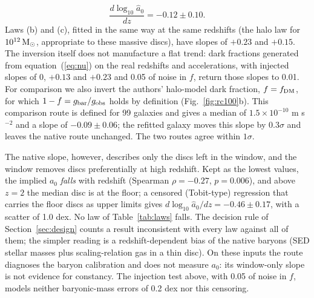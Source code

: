 \documentclass[fleqn,usenatbib]{mnras}
\begin{document}
\begin{equation}
\frac{d\log_{10}\hat a_0}{dz}=-0.12\pm0.10 .
\end{equation}
Laws (b) and (c), fitted in the same way at the same redshifts (the halo law for $10^{12}\,{\rm M_\odot}$, appropriate to these massive discs), have slopes of $+0.23$ and $+0.15$. The inversion itself does not manufacture a flat trend: dark fractions generated from equation~(\ref{eq:nu}) on the real redshifts and accelerations, with injected slopes of 0, $+0.13$ and $+0.23$ and 0.05 of noise in $f$, return those slopes to 0.01. For comparison we also invert the authors' halo-model dark fraction, $f=f_{\rm DM}$, for which $1-f=g_{\rm bar}/g_{\rm obs}$ holds by definition (Fig.~\ref{fig:rc100}b). This comparison route is defined for 99 galaxies and gives a median of $1.5\times10^{-10}$ m s$^{-2}$ and a slope of $-0.09\pm0.06$; the refitted galaxy moves this slope by $0.3\sigma$ and leaves the native route unchanged. The two routes agree within $1\sigma$.

The native slope, however, describes only the discs left in the window, and the window removes discs preferentially at high redshift. Kept as the lowest values, the implied $a_0$ \emph{falls} with redshift (Spearman $\rho=-0.27$, $p=0.006$), and above $z=2$ the median disc is at the floor; a censored (Tobit-type) regression that carries the floor discs as upper limits gives $d\log_{10}\hat a_0/dz=-0.46\pm0.17$, with a scatter of 1.0 dex. No law of Table~\ref{tab:laws} falls. The decision rule of Section~\ref{sec:design} counts a result inconsistent with every law against all of them; the simpler reading is a redshift-dependent bias of the native baryons (SED stellar masses plus scaling-relation gas in a thin disc). On these inputs the route diagnoses the baryon calibration and does not measure $a_0$: its window-only slope is not evidence for constancy. The injection test above, with 0.05 of noise in $f$, models neither baryonic-mass errors of 0.2 dex nor this censoring.
\end{document}
